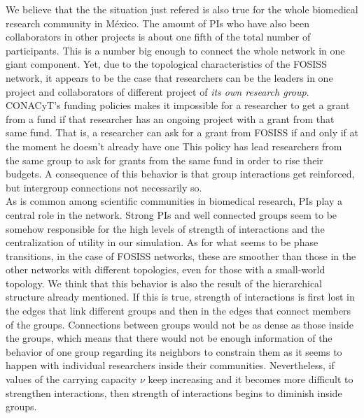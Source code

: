 \documentclass[11pt]{article}
\begin{document}
  We believe that the the situation just refered is also
  true for the whole biomedical research community in M\'exico. The
  amount of PIs who have also been collaborators in other projects is
  about one fifth of the total number of participants.  This is a
  number big enough to connect the whole network in one giant
  component. Yet, due to the topological characteristics of the FOSISS
  network, it appears to be the case that researchers can be the
  leaders in one project and collaborators of different project of
  \emph{its own research group}. CONACyT's funding policies makes it
  impossible for a researcher to get a grant from a fund if that
  researcher has an ongoing project with a grant from that same
  fund. That is, a researcher can ask for a grant from FOSISS if and
  only if at the moment he doesn't already have one
  This policy has lead researchers from the same group to ask
  for grants from the same fund in order to rise their budgets. A
  consequence of this behavior is that group interactions get
  reinforced, but intergroup connections not necessarily so.\\

 As is common among scientific communities in biomedical
  research, PIs play a central role in the network. Strong PIs and
  well connected groups seem to be somehow responsible for the high
  levels of strength of interactions and the centralization of utility
  in our simulation. As for what seems to be phase transitions, in the
  case of FOSISS networks, these are smoother than those in the other
  networks with different topologies, even for those with a
  small-world topology. We think that this behavior is also the result
  of the hierarchical structure already mentioned. If this is true,
  strength of interactions is first lost in the edges that link
  different groups and then in the edges that connect members of the
  groups. Connections between groups would not be as dense as those
  inside the groups, which means that there would not be enough
  information of the behavior of one group regarding its neighbors to
  constrain them as it seems to happen with individual researchers
  inside their communities. Nevertheless, if values of the carrying
  capacity $\nu$ keep increasing and it becomes more difficult to
  strengthen interactions, then strength of interactions begins to
  diminish inside groups.\\
\end{document}
